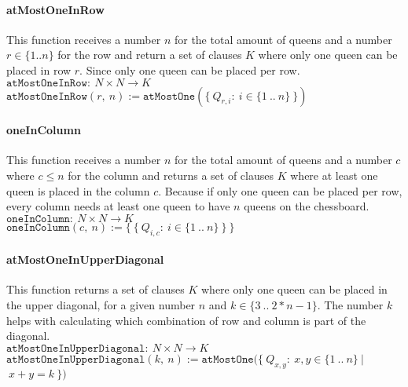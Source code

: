 \paragraph{atMostOneInRow}
This function receives a number $n$ for the total amount of queens and a number $r \in \{1 .. n\}$ for the row and return a set of clauses $K$ where only one queen can be placed in row $r$. Since only one queen can be placed per row.
\\[0.2cm]
\hspace*{1.3cm} $\texttt{atMostOneInRow}:\ N \times N \to K$
\\[0.2cm]
\hspace*{1.3cm} $\texttt{atMostOneInRow}(r,\ n) := \texttt{atMostOne}(\{\ Q_{r,i} :\ i \in \{1\ ..\ n\}\ \})$

\paragraph{oneInColumn}
This function receives a number $n$ for the total amount of queens and a number $c$ where $c \leq n$ for the column and returns a set of clauses $K$ where at least one queen is placed in the column $c$. Because if only one queen can be placed per row, every column needs at least one queen to have $n$ queens on the chessboard.
\\[0.2cm]
\hspace*{1.3cm} $\texttt{oneInColumn}:\ N \times N \to K$
\\[0.2cm]
\hspace*{1.3cm} $\texttt{oneInColumn}(c,\ n) := \{\ \{\ Q_{i,c} :\ i \in \{1\ ..\ n\}\ \}\ \}$

\paragraph{atMostOneInUpperDiagonal}
This function returns a set of clauses $K$ where only one queen can be placed in the upper diagonal, for a given number $n$ and $k \in \{3\ ..\ 2 * n - 1\}$. The number $k$ helps with calculating which combination of row and column is part of the diagonal.
\\[0.2cm]
\hspace*{1.3cm} $\texttt{atMostOneInUpperDiagonal}:\ N \times N \to K$
\\[0.2cm]
\hspace*{1.3cm} $\texttt{atMostOneInUpperDiagonal}(k,\ n) := \texttt{atMostOne}(\{\ Q_{x,y} :\ x,y \in \{1\ ..\ n\}\ |$
\hspace*{11.5cm} $\ x + y = k\ \})$

